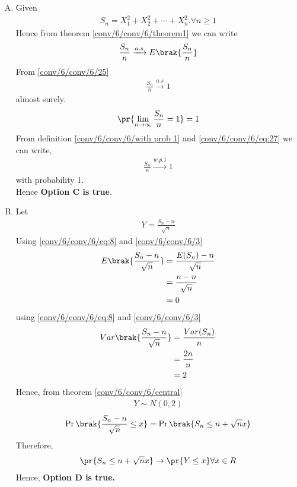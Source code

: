 \begin{enumerate}[(A)]
     
     
     \item Given 
    \begin{align}
        S_{n}=X_{1}^2+X_{2}^2+\cdots+X_{n}^2.\forall n\geq 1
    \end{align}
    Hence from theorem \ref{conv/6/conv/6/theorem1} we can write 
    \begin{align}
        \frac{S_n}{n} \xrightarrow{a.s} E\brak{\frac{S_n}{n}}
    \end{align}
    From \eqref{conv/6/conv/6/25}
    \begin{align}
         \frac{S_n}{n} \xrightarrow{a.s} 1
    \end{align}
    almost surely.
    \begin{align}
        \pr{\lim_{n\to \infty}\frac{S_n}{n}=1}=1\label{conv/6/eq:27}
    \end{align}
    From definition \ref{conv/6/conv/6/with prob 1} and \eqref{conv/6/conv/6/eq:27} we can write,
    \begin{align}
        \frac{S_{n}}{n} \xrightarrow{w.p.1} 1
    \end{align}
    with probability 1.\\
    Hence \textbf{Option C is true}.
    \item
    Let 
    \begin{align}
        Y=\frac{S_{n}-n}{\sqrt{n}}
    \end{align}
    Using \eqref{conv/6/conv/6/eq:8} and \eqref{conv/6/conv/6/3}
    \begin{align}
        E\brak{\frac{S_{n}-n}{\sqrt{n}}}&=\frac{E(S_n)-n}{\sqrt{n}}\\
        &=\frac{n-n}{\sqrt{n}}\\
        &=0
    \end{align}
    using \eqref{conv/6/conv/6/eq:8} and \eqref{conv/6/conv/6/3}
    \begin{align}
         Var\brak{\frac{S_{n}-n}{\sqrt{n}}}&=\frac{Var(S_n)}{n}\\
         &=\frac{2n}{n}\\
         &=2
    \end{align}
    Hence, from theorem \eqref{conv/6/conv/6/central}
    \begin{align}
        Y \sim N(0,2)\label{conv/6/eq:D}
    \end{align}
    \begin{align}
         \Pr{\brak{\frac{S_{n}-n}{\sqrt{n}} \leq x}}= \Pr{\brak{S_{n} \leq n+\sqrt{n}x}}
    \end{align}
    Therefore,
    \begin{align}
       \pr{S_n \leq n+ \sqrt{n}x} \rightarrow \pr{Y \leq x} \forall x \in R \label{conv/6/new}
    \end{align}
    Hence, \textbf{Option D is true.}
     
     \end{enumerate}